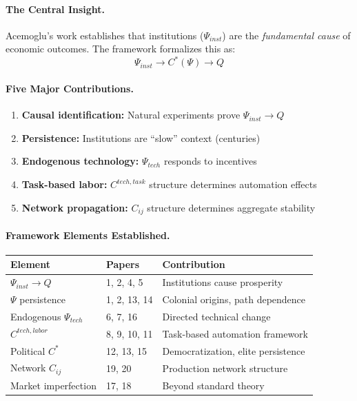 \documentclass[12pt,a4paper]{article}
\begin{document}
\paragraph{The Central Insight.}
Acemoglu's work establishes that institutions ($\Psi_{inst}$) are the
\emph{fundamental cause} of economic outcomes. The framework formalizes
this as:
\begin{equation}
  \Psi_{inst} \to C^*(\Psi) \to Q
\end{equation}

\paragraph{Five Major Contributions.}

\begin{enumerate}
  \item \textbf{Causal identification:} Natural experiments prove $\Psi_{inst} \to Q$
  \item \textbf{Persistence:} Institutions are ``slow'' context (centuries)
  \item \textbf{Endogenous technology:} $\Psi_{tech}$ responds to incentives
  \item \textbf{Task-based labor:} $C^{tech,task}$ structure determines automation effects
  \item \textbf{Network propagation:} $C_{ij}$ structure determines aggregate stability
\end{enumerate}

\paragraph{Framework Elements Established.}

\begin{center}
\renewcommand{\arraystretch}{1.2}
\small
\begin{tabular}{lll}
\hline
\textbf{Element} & \textbf{Papers} & \textbf{Contribution} \\
\hline
$\Psi_{inst} \to Q$ & 1, 2, 4, 5 & Institutions cause prosperity \\
$\Psi$ persistence & 1, 2, 13, 14 & Colonial origins, path dependence \\
Endogenous $\Psi_{tech}$ & 6, 7, 16 & Directed technical change \\
$C^{tech,labor}$ & 8, 9, 10, 11 & Task-based automation framework \\
Political $C^*$ & 12, 13, 15 & Democratization, elite persistence \\
Network $C_{ij}$ & 19, 20 & Production network structure \\
Market imperfection & 17, 18 & Beyond standard theory \\
\hline
\end{tabular}
\end{center}
\end{document}
